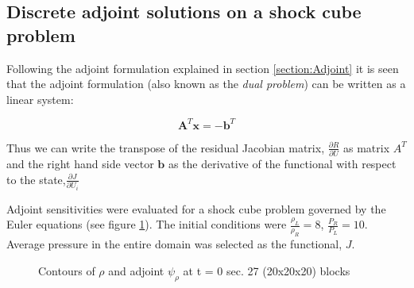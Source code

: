 \subsection{Discrete adjoint solutions on a shock cube problem}
\label{subsection:Discrete_Adjoint}

Following the adjoint formulation explained in section \ref{section:Adjoint} it is seen that the adjoint formulation (also known as the \textit{dual problem}) can be written as a linear system:

\begin{equation}
\mathbf{A}^T\mathbf{x} = -\mathbf{b}^T
\end{equation}

Thus we can write the transpose of the residual Jacobian matrix, $\frac{\partial{R}}{\partial{U}}$ as matrix $A^T$ and the right hand side vector $\mathbf{b}$ as the derivative of the functional with respect to the state,$\frac{\partial{J}}{\partial{U_i}}$\par

Adjoint sensitivities were evaluated for a shock cube problem governed by the Euler equations (see figure \ref{fig:Adjoints}). The initial conditions were $\frac{\rho_L}{\rho_R} = 8$, $\frac{P_R}{P_L} = 10$. Average pressure in the entire domain was selected as the functional, $J$. \par

\begin{figure}[t!]
  \centering
\caption{Contours of $\rho$ and adjoint $\psi_{\rho}$ at t = 0 sec. 27 (20x20x20) blocks} 
\label{fig:Adjoints}      
\end{figure}  